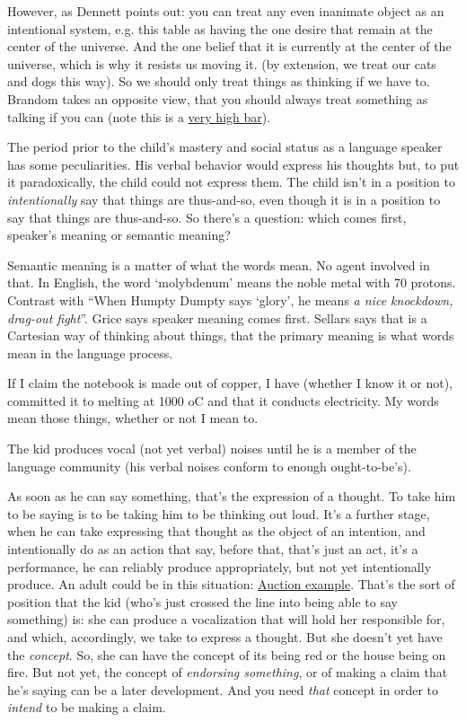 However, as Dennett points out: you can treat any even inanimate object as an intentional system, e.g. this table as having the one desire that remain at the center of the universe. And the one belief that it is currently at the center of the universe, which is why it resists us moving it. (by extension, we treat our cats and dogs this way). So we should only treat things as thinking if we have to. Brandom takes an opposite view, that you should always treat something as talking if you can (note this is a \href{doc/phil/Phil Situations/Novel sentence|Used as example}{very high bar}).



The period prior to the child's mastery and social status as a language speaker has some peculiarities. His verbal behavior would express his thoughts but, to put it paradoxically, the child could not express them. The child isn't in a position to \emph{intentionally} say that things are thus-and-so, even though it is in a position to say that things are thus-and-so. So there's a question: which comes first, speaker's meaning or semantic meaning?

Semantic meaning is a matter of what the words mean. No agent involved in that. In English, the word `molybdenum' means the noble metal with 70 protons. Contrast with ``When Humpty Dumpty says `glory', he means \emph{a nice knockdown, drag-out fight}''. Grice says speaker meaning comes first. Sellars says that is a Cartesian way of thinking about things, that the primary meaning is what words mean in the language process.

If I claim the notebook is made out of copper, I have (whether I know it or not), committed it to melting at 1000 oC and that it conducts electricity. My words mean those things, whether or not I mean to.

The kid produces vocal (not yet verbal) noises until he is a member of the language community (his verbal noises conform to enough ought-to-be's).

As soon as he can say something, that's the expression of a thought. To take him to be saying is to be taking him to be thinking out loud. It's a further stage, when he can take expressing that thought as the object of an intention, and intentionally do as an action that say, before that, that's just an act, it's a performance, he can reliably produce appropriately, but not yet intentionally produce. An adult could be in this situation: \href{doc/phil/Phil Situations/Auction}{Auction example}. That's the sort of position that the kid (who's just crossed the line into being able to say something) is: she can produce a vocalization that will hold her responsible for, and which, accordingly, we take to express a thought. But she doesn't yet have the \emph{concept}. So, she can have the concept of its being red or the house being on fire. But not yet, the concept of \emph{endorsing something}, or of making a claim that he's saying can be a later development. And you need \emph{that} concept in order to \emph{intend} to be making a claim.

